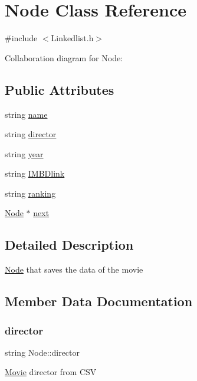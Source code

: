 \hypertarget{classNode}{}\section{Node Class Reference}
\label{classNode}


{\ttfamily \#include $<$Linkedlist.\+h$>$}



Collaboration diagram for Node\+:
\subsection*{Public Attributes}
\begin{DoxyCompactItemize}
\item 
string \hyperlink{classNode_a4cd656d544174479df27f0759e5a3997}{name}
\item 
string \hyperlink{classNode_a0c49da154ffb186d6549d7d53c1bf370}{director}
\item 
string \hyperlink{classNode_a4f6ff565b56749f038ee05d16df44ad5}{year}
\item 
string \hyperlink{classNode_af8fbd0b823ac254984e640a507168090}{I\+M\+B\+Dlink}
\item 
string \hyperlink{classNode_a0da19ae4ea31aa6149cf3c3186cd73df}{ranking}
\item 
\hyperlink{classNode}{Node} $\ast$ \hyperlink{classNode_a2559a716f69ccaa76d648d9f1b83065e}{next}
\end{DoxyCompactItemize}


\subsection{Detailed Description}
\hyperlink{classNode}{Node} that saves the data of the movie 

\subsection{Member Data Documentation}
\mbox{\label{classNode_a0c49da154ffb186d6549d7d53c1bf370}} 
\subsubsection{\texorpdfstring{director}{director}}
{\footnotesize\ttfamily string Node\+::director}

\hyperlink{classMovie}{Movie} director from C\+SV \mbox{\label{classNode_af8fbd0b823ac254984e640a507168090}} 
